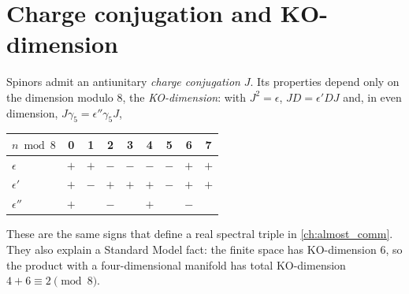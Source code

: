 \section{Charge conjugation and KO-dimension}
Spinors admit an antiunitary \emph{charge conjugation} $J$. Its properties depend only on the dimension modulo $8$, the \emph{KO-dimension}: with $J^2=\epsilon$, $JD=\epsilon'DJ$ and, in even dimension, $J\gamma_5=\epsilon''\gamma_5J$,
\begin{center}\small
\begin{tabular}{@{}l*{8}{c}@{}}
\toprule
$n \bmod 8$ & 0 & 1 & 2 & 3 & 4 & 5 & 6 & 7\\
\midrule
$\epsilon$ & $+$ & $+$ & $-$ & $-$ & $-$ & $-$ & $+$ & $+$\\
$\epsilon'$ & $+$ & $-$ & $+$ & $+$ & $+$ & $-$ & $+$ & $+$\\
$\epsilon''$ & $+$ & & $-$ & & $+$ & & $-$ & \\
\bottomrule
\end{tabular}
\end{center}
These are the same signs that define a real spectral triple in \cref{ch:almost_comm}. They also explain a Standard Model fact: the finite space has KO-dimension $6$, so the product with a four-dimensional manifold has total KO-dimension $4+6\equiv2\pmod 8$.

